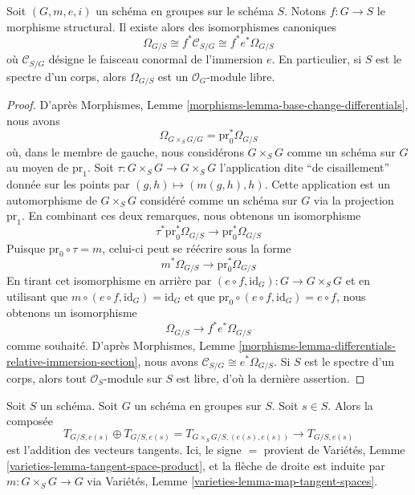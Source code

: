 \begin{lemma}
\label{lemma-group-scheme-module-differentials}
\begin{reference}
\cite[Proposition 3.15]{BookAV}
\end{reference}
Soit $(G, m, e, i)$ un schéma en groupes sur le schéma $S$.
Notons $f : G \to S$ le morphisme structural.
Il existe alors des isomorphismes canoniques
$$
\Omega_{G/S} \cong f^*\mathcal{C}_{S/G} \cong f^*e^*\Omega_{G/S}
$$
où $\mathcal{C}_{S/G}$ désigne le faisceau conormal de
l'immersion $e$. En particulier, si $S$ est le spectre d'un corps, alors
$\Omega_{G/S}$ est un $\mathcal{O}_G$-module libre.
\end{lemma}

\begin{proof}
D'après Morphismes, Lemme \ref{morphisms-lemma-base-change-differentials}, nous avons
$$
\Omega_{G \times_S G/G} = \text{pr}_0^*\Omega_{G/S}
$$
où, dans le membre de gauche, nous considérons $G \times_S G$ comme un schéma sur $G$
au moyen de $\text{pr}_1$.
Soit $\tau : G \times_S G \to G \times_S G$ l'application dite ``de cisaillement''
donnée sur les points par $(g, h) \mapsto (m(g, h), h)$. Cette application est un automorphisme
de $G \times_S G$ considéré comme un schéma sur $G$ via la projection $\text{pr}_1$.
En combinant ces deux remarques, nous obtenons un isomorphisme
$$
\tau^*\text{pr}_0^*\Omega_{G/S} \to \text{pr}_0^*\Omega_{G/S}
$$
Puisque $\text{pr}_0 \circ \tau = m$, celui-ci peut se réécrire sous la forme
$$
m^*\Omega_{G/S} \to \text{pr}_0^*\Omega_{G/S}
$$
En tirant cet isomorphisme en arrière par
$(e \circ f, \text{id}_G) : G \to G \times_S G$
et en utilisant que $m \circ (e \circ f, \text{id}_G) = \text{id}_G$
et que $\text{pr}_0 \circ (e \circ f, \text{id}_G) = e \circ f$,
nous obtenons un isomorphisme
$$
\Omega_{G/S} \to f^*e^*\Omega_{G/S}
$$
comme souhaité. D'après
Morphismes, Lemme \ref{morphisms-lemma-differentials-relative-immersion-section},
nous avons $\mathcal{C}_{S/G} \cong e^*\Omega_{G/S}$.
Si $S$ est le spectre d'un corps, alors
tout $\mathcal{O}_S$-module sur $S$ est libre,
d'où la dernière assertion.
\end{proof}

\begin{lemma}
\label{lemma-group-scheme-addition-tangent-vectors}
Soit $S$ un schéma. Soit $G$ un schéma en groupes sur $S$.
Soit $s \in S$. Alors la composée
$$
T_{G/S, e(s)} \oplus T_{G/S, e(s)} = T_{G \times_S G/S, (e(s), e(s))}
\rightarrow T_{G/S, e(s)}
$$
est l'addition des vecteurs tangents. Ici, le signe $=$ provient de
Variétés, Lemme \ref{varieties-lemma-tangent-space-product},
et la flèche de droite est induite par $m : G \times_S G \to G$ via
Variétés, Lemme \ref{varieties-lemma-map-tangent-spaces}.
\end{lemma}

